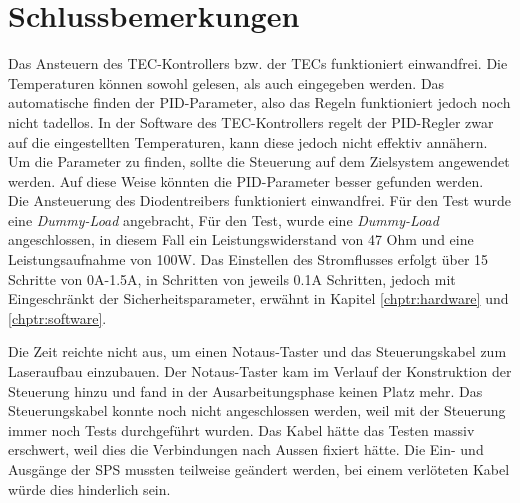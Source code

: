 \section{Schlussbemerkungen}
Das Ansteuern des TEC-Kontrollers bzw. der TECs funktioniert einwandfrei. Die Temperaturen können sowohl gelesen, als auch eingegeben werden. Das automatische finden der PID-Parameter, also das Regeln funktioniert jedoch noch nicht tadellos. In der Software des TEC-Kontrollers regelt der PID-Regler zwar auf die eingestellten Temperaturen, kann diese jedoch nicht effektiv annähern. Um die Parameter zu finden, sollte die Steuerung auf dem Zielsystem angewendet werden. Auf diese Weise könnten die PID-Parameter besser gefunden werden.\\

Die Ansteuerung des Diodentreibers funktioniert einwandfrei. Für den Test wurde eine \textit{Dummy-Load} angebracht,  Für den Test, wurde eine \textit{Dummy-Load} angeschlossen, in diesem Fall ein Leistungswiderstand von 47 Ohm und eine Leistungsaufnahme von 100W. Das Einstellen des Stromflusses erfolgt über 15 Schritte von 0A-1.5A, in Schritten von jeweils 0.1A Schritten, jedoch mit Eingeschränkt der Sicherheitsparameter, erwähnt in Kapitel \ref{chptr:hardware} und \ref{chptr:software}.


Die Zeit reichte nicht aus, um einen Notaus-Taster und das Steuerungskabel zum Laseraufbau einzubauen. Der Notaus-Taster kam im Verlauf der Konstruktion der Steuerung hinzu und fand in der Ausarbeitungsphase keinen Platz mehr. Das Steuerungskabel konnte noch nicht angeschlossen werden, weil mit der Steuerung immer noch Tests durchgeführt wurden. Das Kabel hätte das Testen massiv erschwert, weil dies die Verbindungen nach Aussen fixiert hätte. Die Ein- und Ausgänge der SPS mussten teilweise geändert werden, bei einem verlöteten Kabel würde dies hinderlich sein.\\

